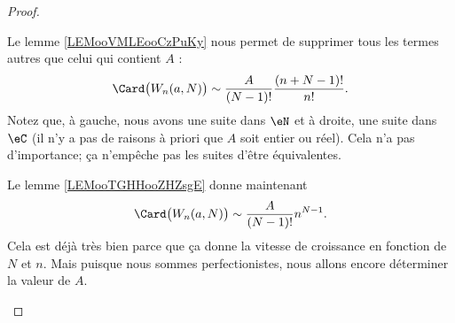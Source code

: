 \begin{proof}
\begin{subproof}
		Le lemme \ref{LEMooVMLEooCzPuKy} nous permet de supprimer tous les termes autres que celui qui contient \( A\) :
		\begin{equation}
			\Card\big( W_n(a,N) \big)\sim\frac{ A }{ (N-1)! }\frac{ (n+N-1)! }{ n! }.
		\end{equation}
		Notez que, à gauche, nous avons une suite dans \( \eN\) et à droite, une suite dans \( \eC\) (il n'y a pas de raisons à priori que \( A\) soit entier ou réel). Cela n'a pas d'importance; ça n'empêche pas les suites d'être équivalentes.

		Le lemme \ref{LEMooTGHHooZHZsgE} donne maintenant
		\begin{equation}        \label{EQooTPXCooGHSzoP}
			\Card\big( W_n(a,N) \big)\sim \frac{ A }{ (N-1)! }n^{N-1}.
		\end{equation}
		Cela est déjà très bien parce que ça donne la vitesse de croissance en fonction de \( N\) et \( n\). Mais puisque nous sommes perfectionistes, nous allons encore déterminer la valeur de \( A\).


\end{subproof}
\end{proof}
